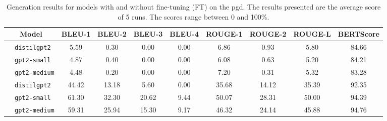\documentclass[11pt]{article}
\begin{document}
\begin{comment}
\begin{table*}[t]
\centering
\small
    \centering
    \begin{tabular}{l|l|cccc|ccc|c}
    \toprule
    \multicolumn{2}{c}{Model} & BLEU-1 & BLEU-2 & BLEU-3 & BLEU-4 & ROUGE-1 & ROUGE-2 & ROUGE-L & BERTScore \\
    \midrule
    \parbox[t]{2mm}{\multirow{3}{*}{\rotatebox[origin=c]{90}{W/o FT}}} &\texttt{distilgpt2}& 0,0559 &0,0030 &0,0000 &0,0000 &0,0686 &0,0093&0,0580 &0,8466 \\
    &\texttt{gpt2-small}& 0,0487&0,0040	&0,0000	&0,0000	&0,0608	&0,0063	&0,0520	&0,8421\\
    &\texttt{gpt2-medium} & 0,0448 &0,0020 &0,0000 &0,0000 &0,0720 &0,0031&0,0532	&0,8328\\
    \midrule
    \parbox[t]{2mm}{\multirow{3}{*}{\rotatebox[origin=c]{90}{W/ FT}}} &\texttt{distilgpt2}&0,4442&0,1318	&0,0560	&0,0000	&0,3568	&0,1412	&0,3539	&0,9235 \\
    &\texttt{gpt2-small}&0,6130	&0,3230	&0,2062	&0,0944	&0,5007	&0,2831	&0,5000	&0,9439\\
    &\texttt{gpt2-medium}&0,5931&0,2594&0,1530&0,0917&0,4632&0,2414	&0,4588	&0,9476\\
    \bottomrule
    \end{tabular}
\caption{Generation results for models with and without fine-tuning (FT) on the \gls*{pgd}. The results presented are the average score of 5 runs. The scores range between 0 and 1.}
\label{tab:gen-results}
\end{table*}
\end{comment}

\begin{table*}[t]
\centering
\small
    \centering
    \begin{tabular}{l|l|cccc|ccc|c}
    \toprule
    \multicolumn{2}{c}{Model} & BLEU-1 & BLEU-2 & BLEU-3 & BLEU-4 & ROUGE-1 & ROUGE-2 & ROUGE-L & BERTScore \\
    \midrule
    \parbox[t]{2mm}{} &\texttt{distilgpt2}& 5.59 & 0.30 &0.00 &0.00 &6.86 &0.93&5.80 &84.66 \\
    &\texttt{gpt2-small}& 4.87&0.40	&0.00	&0.00	&6.08	&0.63	&5.20	&84.21\\
    &\texttt{gpt2-medium} & 4.48 &0.20 &0.00 &0.00 &7.20 &0.31&5.32	&83.28\\
    \midrule
    \parbox[t]{2mm}{} &\texttt{distilgpt2}&44.42&13.18	&5.60	&0.00	&35.68	&14.12	&35.39	&92.35 \\
    &\texttt{gpt2-small}&61.30	&32.30	&20.62	&9.44	&50.07	&28.31	&50.00	&94.39\\
    &\texttt{gpt2-medium}&59.31&25.94&15.30&9.17&46.32&24.14	&45.88	&94.76\\
    \bottomrule
    \end{tabular}
\caption{Generation results for models with and without fine-tuning (FT) on the \gls*{pgd}. The results presented are the average score of 5 runs. The scores range between 0 and 100\%.}
\label{tab:gen-results}
\end{table*}
\end{document}
